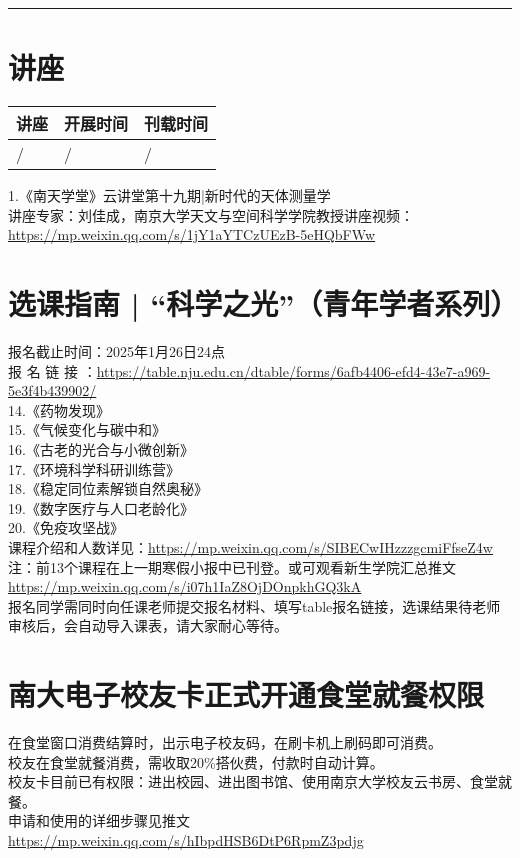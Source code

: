 \documentclass[letterpaper, 12pt]{article}
\begin{document}
\hrule
\pagebreak
\begin{multicols}{2}

\section{讲座}
\begin{tabularx}{0.5\textwidth}{|X|X|X|}
    \hline
    讲座 & 开展时间 & 刊载时间\\
    \hline\hline
/ & / & /\\\hline
\end{tabularx}

1.《南天学堂》云讲堂第十九期|新时代的天体测量学\\
讲座专家：刘佳成，南京大学天文与空间科学学院教授讲座视频：\url{https://mp.weixin.qq.com/s/1jY1aYTCzUEzB-5eHQbFWw}\\

\section{选课指南 | “科学之光”（青年学者系列）}
报名截止时间：2025年1月26日24点\\
报 名 链 接 ：\url{https://table.nju.edu.cn/dtable/forms/6afb4406-efd4-43e7-a969-5e3f4b439902/}\\
14.《药物发现》\\
15.《气候变化与碳中和》\\
16.《古老的光合与小微创新》\\
17.《环境科学科研训练营》\\
18.《稳定同位素解锁自然奥秘》\\
19.《数字医疗与人口老龄化》\\
20.《免疫攻坚战》\\
课程介绍和人数详见：\url{https://mp.weixin.qq.com/s/SIBECwIHzzzgcmiFfseZ4w}\\
注：前13个课程在上一期寒假小报中已刊登。或可观看新生学院汇总推文\url{https://mp.weixin.qq.com/s/i07h1IaZ8OjDOnpkhGQ3kA}\\
报名同学需同时向任课老师提交报名材料、填写table报名链接，选课结果待老师审核后，会自动导入课表，请大家耐心等待。\\

\section{南大电子校友卡正式开通食堂就餐权限}
在食堂窗口消费结算时，出示电子校友码，在刷卡机上刷码即可消费。\\
校友在食堂就餐消费，需收取20\%搭伙费，付款时自动计算。\\
校友卡目前已有权限：进出校园、进出图书馆、使用南京大学校友云书房、食堂就餐。\\
申请和使用的详细步骤见推文\url{https://mp.weixin.qq.com/s/hIbpdHSB6DtP6RpmZ3pdjg}\\



\end{multicols}
\end{document}
